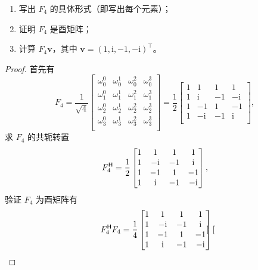 \begin{enumerate}
    \item 写出 $F_4$ 的具体形式（即写出每个元素）；
    \item 证明 $F_4$ 是酉矩阵；
    \item 计算 $F_4\bm{v}$，其中 $\bm{v} = (1, \mathrm{i}, -1, -\mathrm{i})^\top$。
\end{enumerate}

\begin{proof}
    首先有
    \[
        F_4 = \frac{1}{\sqrt{4}} \begin{bmatrix}
            \omega_0^0 & \omega_0^1 & \omega_0^2 & \omega_0^3 \\
            \omega_1^0 & \omega_1^1 & \omega_1^2 & \omega_1^3 \\
            \omega_2^0 & \omega_2^1 & \omega_2^2 & \omega_2^3 \\
            \omega_3^0 & \omega_3^1 & \omega_3^2 & \omega_3^3 \\
        \end{bmatrix} = \frac{1}{2} \begin{bmatrix}
            1 & 1 & 1 & 1 \\
            1 & \mathrm{i} & -1 & -\mathrm{i} \\
            1 & -1 & 1 & -1 \\
            1 & -\mathrm{i} & -1 & \mathrm{i} \\
         \end{bmatrix},
    \]
    求 $F_4$ 的共轭转置
    \[
         F_4^{\mathsf{H}} = \frac{1}{2} \begin{bmatrix}
            1 & 1 & 1 & 1 \\
            1 & -\mathrm{i} & -1 & \mathrm{i} \\
            1 & -1 & 1 & -1 \\
            1 & \mathrm{i} & -1 & -\mathrm{i} \\
         \end{bmatrix},
    \]
    验证 $F_4$ 为酉矩阵有
    \[
        F_4^{\mathsf{H}} F_4 = \frac{1}{4} \begin{bmatrix}
            1 & 1 & 1 & 1 \\
            1 & -\mathrm{i} & -1 & \mathrm{i} \\
            1 & -1 & 1 & -1 \\
            1 & \mathrm{i} & -1 & -\mathrm{i} \\
         \end{bmatrix} \begin{bmatrix}

\end{bmatrix}\]
\end{proof}
